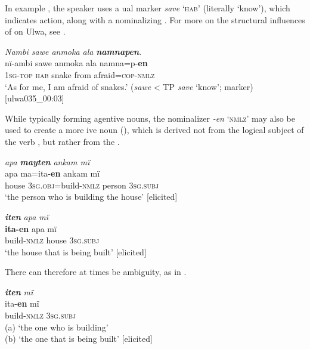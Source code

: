 In example , the speaker uses a  ual marker \textit{save} ‘\textsc{hab}’ (literally ‘know’), which indicates  action, along with a nominalizing . For more on the structural influences of  on Ulwa, see .

\ea%
    \label{ex:nouns:35}
          \textit{Nambi sawe anmoka ala} \textbf{\textit{namnapen}}.\\
\gll nï-ambi   sawe  anmoka  ala namna=p-\textbf{en}\\
    1\textsc{sg-top}  \textsc{hab}  snake    from  afraid=\textsc{cop}{}-\textsc{nmlz}\\
\glt `As for me, I am afraid of snakes.’ (\textit{sawe} < TP \textit{save} ‘know’;  marker) [ulwa035\_00:03]
\z

While typically forming  agentive nouns, the nominalizer  \textit{-en} ‘\textsc{nmlz}’ may also be used to create a more  ive noun (), which is derived not from the logical subject of the verb , but rather from the  .

\ea%
    \label{ex:nouns:36}
          \textit{apa} \textbf{\textit{mayten}} \textit{ankam mï}\\
\gll    apa    ma=ita-\textbf{en}        ankam  mï\\
    house  3\textsc{sg.obj}=build-\textsc{nmlz}  person  3\textsc{sg.subj}\\
\glt `the person who is building the house’ [elicited]
\z

\ea%
    \label{ex:nouns:37}
          \textbf{\textit{iten}} \textit{apa mï}\\
\gll    \textbf{ita-en}      apa    mï\\
    build-\textsc{nmlz}  house  3\textsc{sg.subj}\\
\glt `the house that is being built’ [elicited]
\z

There can therefore at times be ambiguity, as in .

\ea%
    \label{ex:nouns:38}
          \textbf{\textit{iten}} \textit{mï}\\
\gll    ita-\textbf{en}      mï\\
    build-\textsc{nmlz}  3\textsc{sg.subj}\\
\glt    (a) ‘the one who is building’\\
    (b) ‘the one that is being built’ [elicited]
\z


